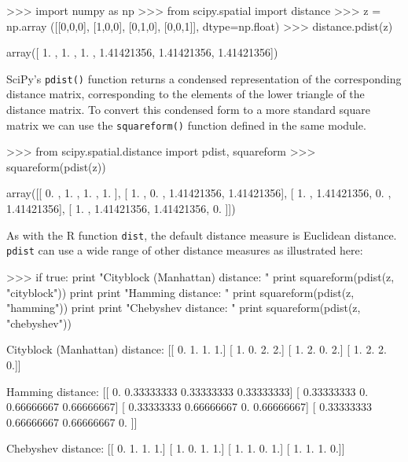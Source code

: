 \begin{python}
>>> import numpy as np
>>> from scipy.spatial import distance
>>> z = np.array ([[0,0,0],
                   [1,0,0],
                   [0,1,0],
                   [0,0,1]], dtype=np.float)
>>> distance.pdist(z)

array([ 1.        ,  1.        ,  1.        ,  1.41421356,  1.41421356,
        1.41421356])
\end{python}

SciPy's \verb~pdist()~ function returns a condensed representation of the corresponding distance matrix, corresponding to the elements of the lower triangle of the distance matrix.  To convert this condensed form to a more standard square matrix we can use the \verb~squareform()~ function defined in the same module. 


\begin{python}
>>> from scipy.spatial.distance import pdist, squareform
>>> squareform(pdist(z))

array([[ 0.        ,  1.        ,  1.        ,  1.        ],
       [ 1.        ,  0.        ,  1.41421356,  1.41421356],
       [ 1.        ,  1.41421356,  0.        ,  1.41421356],
       [ 1.        ,  1.41421356,  1.41421356,  0.        ]])
\end{python}

As with the R function \verb~dist~, the default distance measure is Euclidean distance.  \verb~pdist~ can use a wide range of other distance measures as illustrated here:

\begin{python}
 >>> if true:
         print "Cityblock (Manhattan) distance: "
         print squareform(pdist(z, "cityblock"))
         print
         print "Hamming distance: " 
         print squareform(pdist(z, "hamming"))
         print
         print "Chebyshev distance: "
         print squareform(pdist(z, "chebyshev"))

Cityblock (Manhattan) distance:
[[ 0.  1.  1.  1.]
 [ 1.  0.  2.  2.]
 [ 1.  2.  0.  2.]
 [ 1.  2.  2.  0.]]

Hamming distance:
[[ 0.          0.33333333  0.33333333  0.33333333]
 [ 0.33333333  0.          0.66666667  0.66666667]
 [ 0.33333333  0.66666667  0.          0.66666667]
 [ 0.33333333  0.66666667  0.66666667  0.        ]]

Chebyshev distance:
[[ 0.  1.  1.  1.]
 [ 1.  0.  1.  1.]
 [ 1.  1.  0.  1.]
 [ 1.  1.  1.  0.]]
\end{python}

